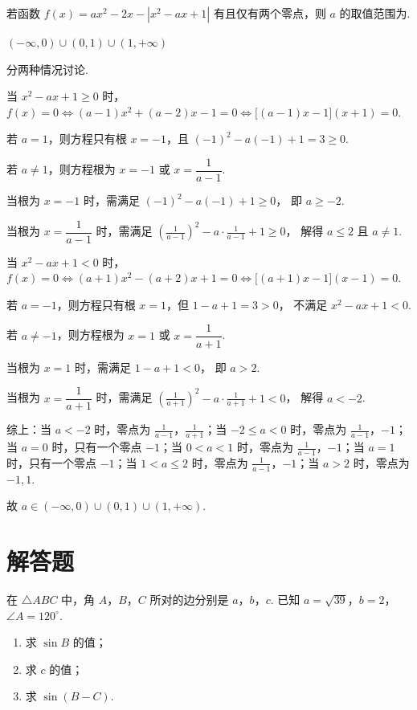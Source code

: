 \begin{problem}
若函数 \(f(x)=ax^2-2x-\left| x^2-ax+1 \right|\) 有且仅有两个零点，则 \(a\) 的取值范围为\fillinblank{}.
\end{problem}

\begin{answer}
\((-\infty,0)\cup (0,1)\cup (1,+\infty)\)
\end{answer}

\begin{solution}
分两种情况讨论.

当 \(x^2-ax+1\ge 0\) 时，\(f(x)=0\Longleftrightarrow (a-1)x^2+(a-2)x-1=0\Longleftrightarrow \bigl[(a-1)x-1\bigr](x+1)=0\).

若 \(a=1\)，则方程只有根 \(x=-1\)，且
\((-1)^2-a(-1)+1=3\ge 0\).

若 \(a\ne 1\)，则方程根为 \(x=-1\) 或 \(x=\dfrac{1}{a-1}\).

当根为 \(x=-1\) 时，需满足
\((-1)^2-a(-1)+1\ge 0\)，
即 \(a\ge -2\).

当根为 \(x=\dfrac{1}{a-1}\) 时，需满足
\(\left( \frac{1}{a-1} \right)^2-a\cdot \frac{1}{a-1}+1\ge 0\)，
解得 \(a\le 2\) 且 \(a\ne 1\).

当 \(x^2-ax+1<0\) 时，\(f(x)=0\Longleftrightarrow (a+1)x^2-(a+2)x+1=0\Longleftrightarrow \bigl[(a+1)x-1\bigr](x-1)=0\).

若 \(a=-1\)，则方程只有根 \(x=1\)，但
\(1-a+1=3>0\)，
不满足 \(x^2-ax+1<0\).

若 \(a\ne -1\)，则方程根为 \(x=1\) 或 \(x=\dfrac{1}{a+1}\).

当根为 \(x=1\) 时，需满足
\(1-a+1<0\)，
即 \(a>2\).

当根为 \(x=\dfrac{1}{a+1}\) 时，需满足
\(\left( \frac{1}{a+1} \right)^2-a\cdot \frac{1}{a+1}+1<0\)，
解得 \(a<-2\).

综上：当 \(a<-2\) 时，零点为 \(\frac{1}{a-1}\)，\(\frac{1}{a+1}\)；当 \(-2\le a<0\) 时，零点为 \(\frac{1}{a-1}\)，\(-1\)；当 \(a=0\) 时，只有一个零点 \(-1\)；当 \(0<a<1\) 时，零点为 \(\frac{1}{a-1}\)，\(-1\)；当 \(a=1\) 时，只有一个零点 \(-1\)；当 \(1<a\le 2\) 时，零点为 \(\frac{1}{a-1}\)，\(-1\)；当 \(a>2\) 时，零点为 \(-1,1\).

故 \(a\in (-\infty,0)\cup (0,1)\cup (1,+\infty)\).
\end{solution}
\section{解答题}

\begin{problem}
在 \(\triangle ABC\) 中，角 \(A\)，\(B\)，\(C\) 所对的边分别是 \(a\)，\(b\)，\(c\). 已知 \(a=\sqrt{39}\)，\(b=2\)，\(\angle A=120^\circ\).

\begin{enumerate}
\item 求 \(\sin B\) 的值；
\item 求 \(c\) 的值；
\item 求 \(\sin(B-C)\).
\end{enumerate}
\end{problem}

